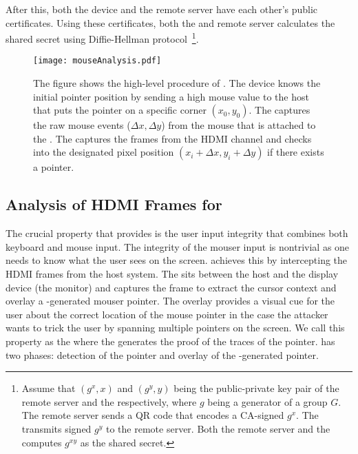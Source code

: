 After this, both the device and the remote server have each other's public certificates. Using these certificates, both the \device and remote server calculates the shared secret using Diffie-Hellman protocol~\footnote{Assume that $(g^x, x)$ and $(g^y, y)$ being the public-private key pair of the remote server and the \device respectively, where $g$ being a generator of a group $G$. The remote server sends a QR code that encodes a CA-signed $g^x$. The \device transmits signed $g^y$ to the remote server. Both the remote server and the \device computes $g^{xy}$ as the shared secret.}.



\begin{figure}[t]
\centering
\texttt{[image: mouseAnalysis.pdf]}
\caption{\textbf{\Pop} The figure shows the high-level procedure of \pop. The device knows the initial pointer position by sending a high mouse value to the host that puts the pointer on a specific corner $(x_0, y_0)$. \one The \device captures the raw mouse events ($\Delta x, \Delta y$) from the mouse that is attached to the \device. \two The \device captures the frames from the HDMI channel and checks into the designated pixel position $(x_i + \Delta x, y_i + \Delta y)$ if there exists a pointer.}
\label{fig:mouseAnalysis}
\centering
\end{figure}



\subsection{Analysis of HDMI Frames for \Pop}
\label{sec:systemDesign:analysis}

The crucial property that \name provides is the user input integrity that combines both keyboard and mouse input. The integrity of the mouser input is nontrivial as one needs to know what the user sees on the screen. \name achieves this by intercepting the HDMI frames from the host system. The \device sits between the host and the display device (the monitor) and captures the frame to extract the cursor context and overlay a \device-generated mouser pointer. The overlay provides a visual cue for the user about the correct location of the mouse pointer in the case the attacker wants to trick the user by spanning multiple pointers on the screen. We call this property as the \emph{\pop} where the \device generates the proof of the traces of the pointer. \Pop has two phases: detection of the pointer and overlay of the \device-generated pointer.

